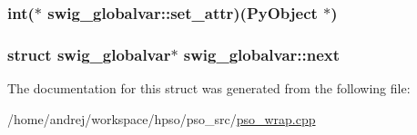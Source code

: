 \hypertarget{structswig__globalvar_494e3d5a5f1fb694b7738fdd1ffdd657}{
\subsubsection{\setlength{\rightskip}{0pt plus 5cm}int($\ast$ {\bf swig\_\-globalvar::set\_\-attr})(PyObject $\ast$)}}
\label{structswig__globalvar_494e3d5a5f1fb694b7738fdd1ffdd657}


\hypertarget{structswig__globalvar_6b7f8fdec3a5c39a52b33c916d7ba028}{
\subsubsection{\setlength{\rightskip}{0pt plus 5cm}struct {\bf swig\_\-globalvar}$\ast$ {\bf swig\_\-globalvar::next}}}
\label{structswig__globalvar_6b7f8fdec3a5c39a52b33c916d7ba028}




The documentation for this struct was generated from the following file:\begin{CompactItemize}
\item 
/home/andrej/workspace/hpso/pso\_\-src/\hyperlink{pso__wrap_8cpp}{pso\_\-wrap.cpp}\end{CompactItemize}

